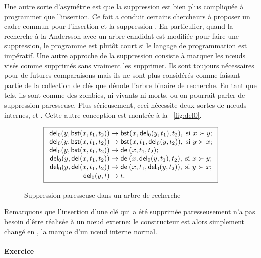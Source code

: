 Une autre sorte d'asymétrie est que la suppression est bien plus
compliquée à programmer que l'insertion. Ce fait a conduit certains
chercheurs à proposer un cadre commun pour l'insertion et la
suppression \citep{Andersson_1991,Hinze_2002}. En particulier, quand
la recherche à la Andersson avec un arbre candidat est modifiée pour
faire une suppression, le programme est plutôt court si le langage de
programmation est impératif. Une autre approche de la suppression
consiste à marquer les nœuds visés comme supprimés sans vraiment les
supprimer. Ils sont toujours nécessaires pour de futures comparaisons
mais ils ne sont plus considérés comme faisant partie de la collection
de clés que dénote l'arbre binaire de recherche. En tant que tels, ils
sont comme des zombies, ni vivants ni morts, ou on pourrait parler de
suppression paresseuse. Plus sérieusement, ceci nécessite deux sortes
de nœuds internes,  et .
Cette autre conception est montrée à la \fig~\vref{fig:del0}.
\begin{figure}
\begin{equation*}
\boxed{
\begin{array}{r@{\;}l@{\;}l}
  \fun{del}_0(y,\fun{bst}(x,t_1,t_2)) & \rightarrow &
  \fun{bst}(x,\fun{del}_0(y,t_1),t_2),\; \text{si \(x \succ y\)};\\
\fun{del}_0(y,\fun{bst}(x,t_1,t_2)) & \rightarrow &
  \fun{bst}(x,t_1,\fun{del}_0(y,t_2)),\; \text{si \(y \succ x\)};\\
\fun{del}_0(y,\fun{bst}(x,t_1,t_2)) & \rightarrow &
  \fun{del}(x,t_1,t_2);\\
\fun{del}_0(y,\fun{del}(x,t_1,t_2)) & \rightarrow &
  \fun{del}(x,\fun{del}_0(y,t_1),t_2),\; \text{si \(x \succ y\)};\\
\fun{del}_0(y,\fun{del}(x,t_1,t_2)) & \rightarrow &
  \fun{del}(x,t_1,\fun{del}_0(y,t_2)),\; \text{si \(y \succ x\)};\\
\fun{del}_0(y,t) & \rightarrow & t.\\
\end{array}}
\end{equation*}
\caption{Suppression paresseuse dans un arbre de recherche}
\label{fig:del0}
\end{figure}
Remarquons que l'insertion d'une clé qui a été supprimée
paresseusement n'a pas besoin d'être réalisée à un nœud externe:
le constructeur  est alors simplement changé en
, la marque d'un nœud interne normal.

\paragraph{Exercice}

